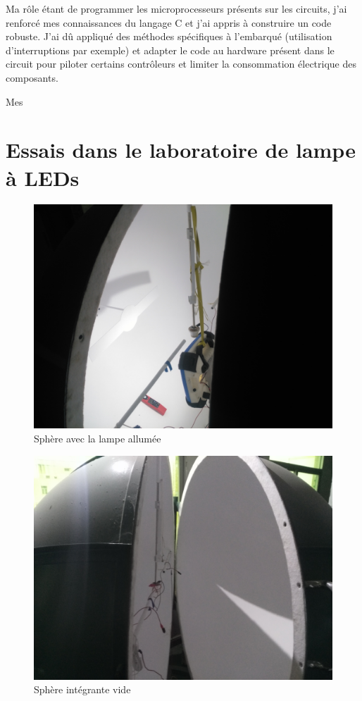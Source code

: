 \documentclass[a4paper, 12pt]{report}
\begin{document}
Ma rôle étant de programmer les microprocesseurs présents sur les circuits, j'ai renforcé mes connaissances du langage C et j'ai appris à construire un code robuste. J'ai dû appliqué des méthodes spécifiques à l'embarqué (utilisation d'interruptions par exemple) et adapter le code au hardware présent dans le circuit pour piloter certains contrôleurs et limiter la consommation électrique des composants.

Mes

\appendix

\chapter{Essais dans le laboratoire de lampe à LEDs}
\label{cha:labo_pictures}

\begin{figure}[H]
\centering
\includegraphics[scale=0.08]{figures/photos/tests_worklamp/sphere/sphere_allumee.jpg}
\caption{Sphère avec la lampe allumée} 
\label{fig:lamp_on}
\end{figure}

\begin{figure}[H]
\centering
\includegraphics[scale=0.08]{figures/photos/tests_worklamp/sphere/spehre_vide.jpg}
\caption{Sphère intégrante vide}
\label{fig:empty_sphere}
\end{figure}
\end{document}
